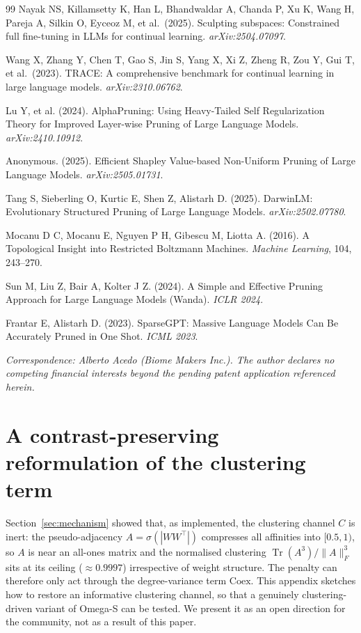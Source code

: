 \documentclass[11pt,a4paper]{article}
\begin{document}
\begin{thebibliography}{99}
Nayak NS, Killamsetty K, Han L, Bhandwaldar A, Chanda P, Xu K, Wang H,
Pareja A, Silkin O, Eyceoz M, et al.\ (2025).
Sculpting subspaces: Constrained full fine-tuning in LLMs for continual
learning.
\emph{arXiv:2504.07097}.

Wang X, Zhang Y, Chen T, Gao S, Jin S, Yang X, Xi Z, Zheng R, Zou Y,
Gui T, et al.\ (2023).
TRACE: A comprehensive benchmark for continual learning in large language
models.
\emph{arXiv:2310.06762}.

Lu Y, et al. (2024).
AlphaPruning: Using Heavy-Tailed Self Regularization Theory for Improved
Layer-wise Pruning of Large Language Models.
\textit{arXiv:2410.10912}.

Anonymous. (2025).
Efficient Shapley Value-based Non-Uniform Pruning of Large Language Models.
\textit{arXiv:2505.01731}.

Tang S, Sieberling O, Kurtic E, Shen Z, Alistarh D. (2025).
DarwinLM: Evolutionary Structured Pruning of Large Language Models.
\textit{arXiv:2502.07780}.

Mocanu D C, Mocanu E, Nguyen P H, Gibescu M, Liotta A. (2016).
A Topological Insight into Restricted Boltzmann Machines.
\textit{Machine Learning}, 104, 243--270.

Sun M, Liu Z, Bair A, Kolter J Z. (2024).
A Simple and Effective Pruning Approach for Large Language Models (Wanda).
\textit{ICLR 2024}.

Frantar E, Alistarh D. (2023).
SparseGPT: Massive Language Models Can Be Accurately Pruned in One Shot.
\textit{ICML 2023}.

\end{thebibliography}

\vspace{1em}
\noindent\textit{Correspondence: Alberto Acedo (Biome Makers Inc.). The author declares no
competing financial interests beyond the pending patent application
referenced herein.}

\appendix

\section{A contrast-preserving reformulation of the clustering term}
\label{app:reform}

Section~\ref{sec:mechanism} showed that, as implemented, the clustering
channel $C$ is inert: the pseudo-adjacency $A=\sigma(|WW^\top|)$ compresses
all affinities into $[0.5,1)$, so $A$ is near an all-ones matrix and the
normalised clustering $\operatorname{Tr}(A^3)/\lVert A\rVert_F^3$ sits at its
ceiling ($\approx0.9997$) irrespective of weight structure. The penalty can
therefore only act through the degree-variance term $\mathrm{Coex}$. This
appendix sketches how to restore an informative clustering channel, so that
a genuinely clustering-driven variant of Omega-S can be tested. We present
it as an open direction for the community, not as a result of this paper.
\end{document}
